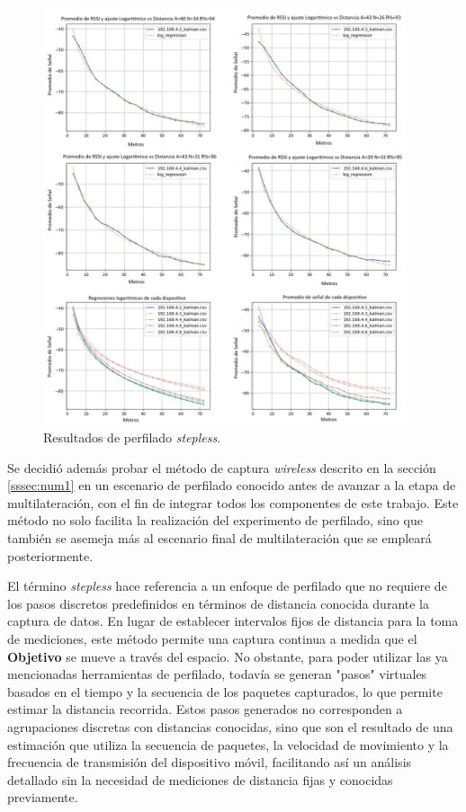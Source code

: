 \begin{figure}[!htb]
    \centering
    \includegraphics[width=0.95\textwidth]{Figuras/profiling/stepless.png}
    \captionsetup{margin=1cm}
    \caption[Stepless]{Resultados de perfilado \textit{stepless}.}
    \label{fig:stepless}
\end{figure}
Se decidió además probar el método de captura \textit{wireless} descrito en la sección \ref{sssec:num1} en un escenario de perfilado conocido antes de avanzar a la etapa de multilateración, con el fin de integrar todos los componentes de este trabajo. Este método no solo facilita la realización del experimento de perfilado, sino que también se asemeja más al escenario final de multilateración que se empleará posteriormente.

El término \textit{stepless} hace referencia a un enfoque de perfilado que no requiere de los pasos discretos predefinidos en términos de distancia conocida durante la captura de datos. En lugar de establecer intervalos fijos de distancia para la toma de mediciones, este método permite una captura continua a medida que el \textbf{Objetivo} se mueve a través del espacio. No obstante, para poder utilizar las ya mencionadas herramientas de perfilado, todavía se generan "pasos" virtuales basados en el tiempo y la secuencia de los paquetes capturados, lo que permite estimar la distancia recorrida. Estos pasos generados no corresponden a agrupaciones discretas con distancias conocidas, sino que son el resultado de una estimación que utiliza la secuencia de paquetes, la velocidad de movimiento y la frecuencia de transmisión del dispositivo móvil, facilitando así un análisis detallado sin la necesidad de mediciones de distancia fijas y conocidas previamente.

